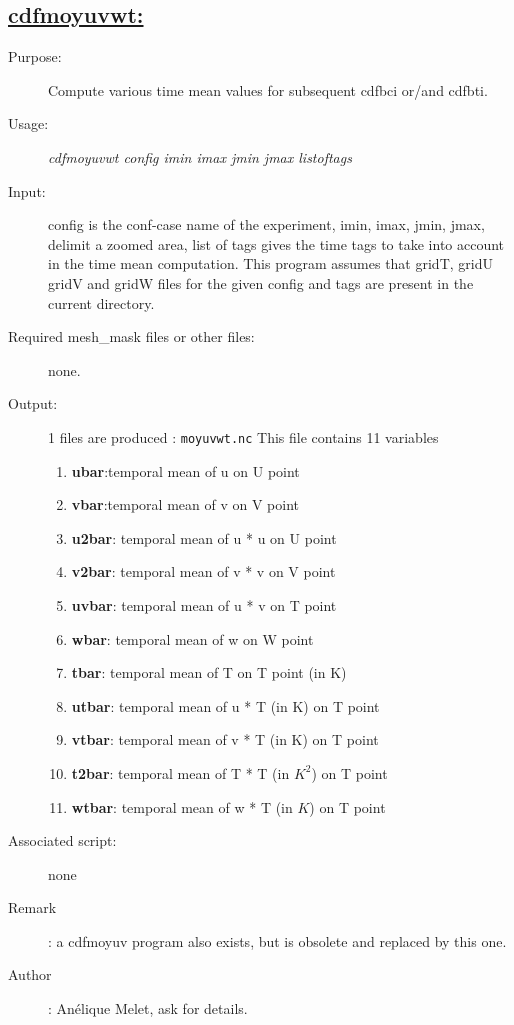 \documentclass[a4paper,11pt]{article}
\begin{document}
\subsection*{\underline{cdfmoyuvwt:}}
\begin{description}
\item[Purpose:] Compute various time mean values for subsequent cdfbci or/and cdfbti.
\item[Usage:] {\em cdfmoyuvwt config imin imax jmin jmax listoftags }
\item[Input:] config is the conf-case name of the experiment, imin, imax, jmin, jmax, delimit a zoomed area, list of tags
       gives the time tags to take into account in the time mean computation. This program assumes that gridT, gridU gridV and gridW 
       files for the given config and tags are present in the current directory.
\item[Required mesh\_mask files or other files:]  none.
\item[Output:] 1 files are produced : {\tt moyuvwt.nc} This file contains 11 variables 
     \begin{enumerate}
       \item {\bf ubar}:temporal mean of u on U point
       \item {\bf vbar}:temporal mean of v on V point
       \item {\bf u2bar}: temporal mean of u * u on U point
       \item {\bf v2bar}: temporal mean of v * v on V point
       \item {\bf uvbar}: temporal mean of u * v on T point
       \item {\bf wbar}: temporal mean of w  on W point
       \item {\bf tbar}: temporal mean of T  on T point (in K)
       \item {\bf utbar}: temporal mean of u * T (in K)  on T point
       \item {\bf vtbar}: temporal mean of v * T (in K)  on T point
       \item {\bf t2bar}: temporal mean of T * T (in $K^2$)  on T point
       \item {\bf wtbar}: temporal mean of w * T (in $K$)  on T point
     \end{enumerate}
\item[Associated script:] none
\item[Remark]: a cdfmoyuv program also exists, but is obsolete and replaced by this one.
\item[Author]: An\'elique Melet, ask for details.
\end{description}
\end{document}
